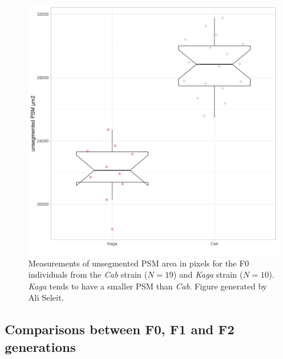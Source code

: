 \documentclass[
]{book}
\begin{document}
\begin{figure}
\includegraphics[width=1\linewidth]{figs/somites/ali_PSM_Cab_Kaga} \caption{Measurements of unsegmented PSM area in pixels for the F0 individuals from the \emph{Cab} strain (\(N = 19\)) and \emph{Kaga} strain (\(N = 10\)). \emph{Kaga} tends to have a smaller PSM than \emph{Cab}. Figure generated by Ali Seleit.}\label{fig:ali-psm-F0}
\end{figure}

\clearpage

\hypertarget{comparisons-between-f0-f1-and-f2-generations}{%
\subsection{Comparisons between F0, F1 and F2 generations}\label{comparisons-between-f0-f1-and-f2-generations}}
\end{document}
